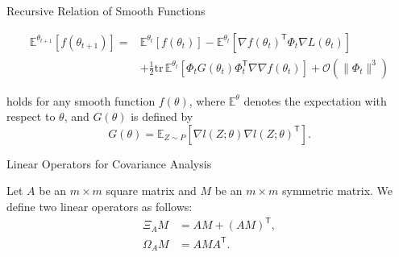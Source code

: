 \documentclass[fleqn,aspectratio=1610]{beamer}
\begin{document}
\begin{frame}[label={sec:org98fc760}]{Recursive Relation of Smooth Functions}
\begin{lemma}[Amari, 1967]\label{sec:orgadece74}
\nocite{Amari1967}

\begin{align}
  \mathbb{E}^{\theta_{t+1}}\left[f(\theta_{t+1})\right]%
  =&
     \mathbb{E}^{\theta_{t}}\left[f(\theta_{t})\right]
     -\mathbb{E}^{\theta_{t}}\left[\nabla f(\theta_{t})^{\mathsf{T}}\varPhi_{t}
     \nabla L(\theta_{t})\right]\\
   &+\frac{1}{2}\mathrm{tr}\,
     \mathbb{E}^{\theta_{t}}\left[
     \varPhi_{t}G(\theta_{t})\varPhi_{t}^{\mathsf{T}}\nabla\nabla f(\theta_{t})
     \right]
     +\mathcal{O}(\|\varPhi_{t}\|^3)
\end{align}

holds for any smooth function \(f(\theta)\),
where \(\mathbb{E}^{\theta}\) 
denotes the expectation with respect to \(\theta\),
and \(G(\theta)\) is defined by
\begin{equation}
  G(\theta)=
  \mathbb{E}_{Z\sim P}
  \left[\nabla l(Z;\theta)\nabla l(Z;\theta)^{\mathsf{T}}\right].
\end{equation}
\end{lemma}
\end{frame}

\begin{frame}[label={sec:org9aa1f94}]{Linear Operators for Covariance Analysis}
\begin{definition}[]\label{sec:orga3403df}
Let \(A\) be an \(m\times m\) square matrix 
and \(M\) be an \(m\times m\) symmetric matrix.
We define two linear operators as follows:
\begin{align}
  \Xi_{A}M
  &= AM+(AM)^{\mathsf{T}},\\
  \Omega_{A}M
  &= AMA^{\mathsf{T}}.
\end{align}
\end{definition}
\end{frame}
\end{document}
